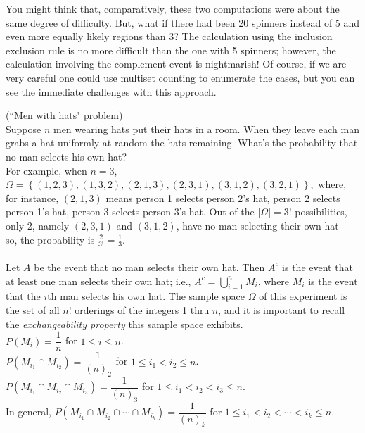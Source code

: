 \documentclass[12pt]{article}
\begin{document}
\noindent You might think that, comparatively, these two computations were about the same degree of difficulty. But, what if there had been 20 spinners instead of 5 and even more equally likely regions than 3?  The calculation using the inclusion exclusion rule is no more difficult than the one with 5 spinners; however, the calculation involving the complement event is nightmarish!  Of course, if we are very careful one could use multiset counting to enumerate the cases, but you can see the immediate challenges with this approach.



\newpage


 (``Men with hats" problem)\\
Suppose $n$ men wearing hats put their hats in a room. When they leave each man grabs a hat uniformly at random the hats remaining.
What's the probability that no man selects his own hat?\\

\noindent For example, when $n=3$,
$\Omega = \left\{(1,2,3), (1,3,2), (2,1,3), (2,3,1), (3,1,2), (3,2,1) \right\},$
where, for instance,  $(2,1,3)$ means person 1 selects person 2's hat, person 2 selects person 1's hat, person 3 selects person 3's hat.
Out of the $|\Omega|=3!$ possibilities, only 2, namely $(2,3,1)$ and $(3,1,2)$,
have no man selecting their own hat -- so, the probability is $\frac 2{3!}=\frac 13$.\\

\\

\noindent Let $A$ be the event that no man selects their own hat. Then $A^c$ is the event that at least one man selects their own hat; i.e., $A^c = \bigcup_{i=1}^nM_i$, where
$M_i$ is the event that the $i$th man selects his own hat.  The sample space $\Omega$ of this experiment is the set of all $n!$ orderings of the integers 1 thru $n$, and it is important to recall the {\em exchangeability property} this sample space exhibits.\\

\noindent $P(M_i) = \dfrac 1n$ for $1\le i\le n$.\\
\noindent $P(M_{i_1}\cap M_{i_2}) = \dfrac 1{(n)_2}$ for $1\le i_1<i_2\le n$.\\
\noindent $P(M_{i_1}\cap M_{i_2}\cap M_{i_3}) = \dfrac 1{(n)_3}$ for $1\le i_1<i_2<i_3\le n$.\\
\noindent In general, $P(M_{i_1}\cap M_{i_2}\cap \cdots \cap M_{i_k}) = \dfrac 1{(n)_k}$ for $1\le i_1<i_2<\cdots <i_k\le n$.\\
\end{document}
